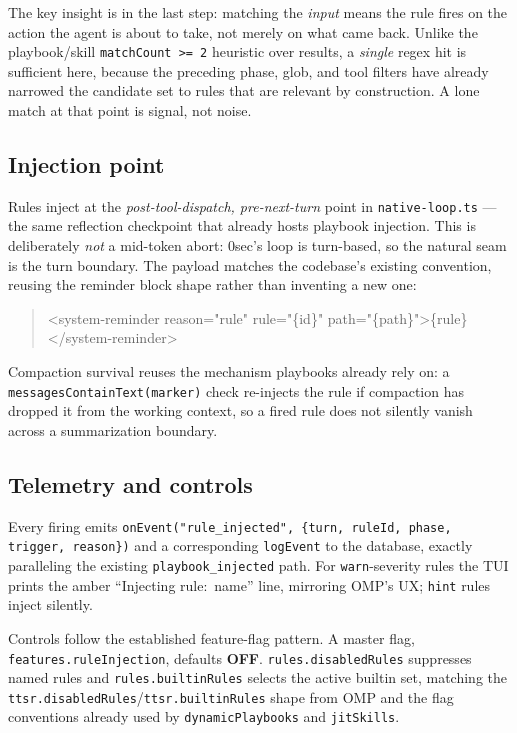 \documentclass[11pt]{article}
\begin{document}
The key insight is in the last step: matching the \emph{input} means the rule
fires on the action the agent is about to take, not merely on what came back.
Unlike the playbook/skill \texttt{matchCount >= 2} heuristic over results, a
\emph{single} regex hit is sufficient here, because the preceding phase, glob, and
tool filters have already narrowed the candidate set to rules that are relevant
by construction. A lone match at that point is signal, not noise.

\subsection{Injection point}

Rules inject at the \emph{post-tool-dispatch, pre-next-turn} point in
\texttt{native-loop.ts} --- the same reflection checkpoint that already hosts
playbook injection. This is deliberately \emph{not} a mid-token abort: 0sec's
loop is turn-based, so the natural seam is the turn boundary. The payload matches
the codebase's existing convention, reusing the reminder block shape rather than
inventing a new one:

\begin{quote}\ttfamily
<system-reminder reason="rule" rule="\{id\}" path="\{path\}">\{rule\}</system-reminder>
\end{quote}

Compaction survival reuses the mechanism playbooks already rely on: a
\texttt{messagesContainText(marker)} check re-injects the rule if compaction has
dropped it from the working context, so a fired rule does not silently vanish
across a summarization boundary.

\subsection{Telemetry and controls}

Every firing emits \texttt{onEvent("rule\_injected", \{turn, ruleId, phase,
trigger, reason\})} and a corresponding \texttt{logEvent} to the database,
exactly paralleling the existing \texttt{playbook\_injected} path. For
\texttt{warn}-severity rules the TUI prints the amber ``Injecting rule:
\guillemotright{}\,name'' line, mirroring OMP's UX; \texttt{hint} rules inject
silently.

Controls follow the established feature-flag pattern. A master flag,
\texttt{features.ruleInjection}, defaults \textbf{OFF}. \texttt{rules.disabledRules}
suppresses named rules and \texttt{rules.builtinRules} selects the active builtin
set, matching the \texttt{ttsr.disabledRules}/\texttt{ttsr.builtinRules} shape from
OMP and the flag conventions already used by \texttt{dynamicPlaybooks} and
\texttt{jitSkills}.
\end{document}
